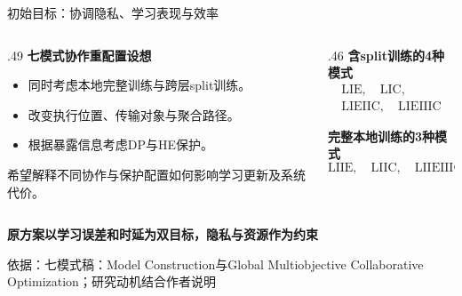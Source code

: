 \documentclass[aspectratio=169,11pt]{beamer}
\newcommand{\key}[1]{{\color{Teal}\bfseries #1}}
\newcommand{\src}[1]{\vfill{\color{Gray}\fontsize{7.5}{9}\selectfont 依据：#1\par}}
\newcommand{\msg}[1]{\par\vspace{.14cm}{\color{Teal}\rule{.32cm}{1.5pt}}\hspace{.18cm}\textbf{#1}\par}
\newcommand{\tight}{\setlength{\itemsep}{.18cm}}
\begin{document}
\begin{frame}{初始目标：协调隐私、学习表现与效率}
\begin{columns}[T,onlytextwidth]
\begin{column}{.49\textwidth}
\key{七模式协作重配置设想}
\begin{itemize}\tight
\item 同时考虑本地完整训练与跨层split训练。
\item 改变执行位置、传输对象与聚合路径。
\item 根据暴露信息考虑DP与HE保护。
\end{itemize}
\par\vspace{.20cm}
希望解释不同协作与保护配置如何影响学习更新及系统代价。
\end{column}
\begin{column}{.46\textwidth}
\key{含split训练的4种模式}
\[
\begin{gathered}
\mathrm{LIE},\quad\mathrm{LIC},\\
\mathrm{LIEIIC},\quad\mathrm{LIEIIIC}
\end{gathered}
\]
\par\vspace{.15cm}
\key{完整本地训练的3种模式}
\[
\mathrm{LIIE},\quad\mathrm{LIIC},\quad\mathrm{LIIEIIIC}
\]
\end{column}
\end{columns}
\msg{原方案以学习误差和时延为双目标，隐私与资源作为约束}
\src{七模式稿：Model Construction与Global Multiobjective Collaborative Optimization；研究动机结合作者说明}
\end{frame}
\end{document}
